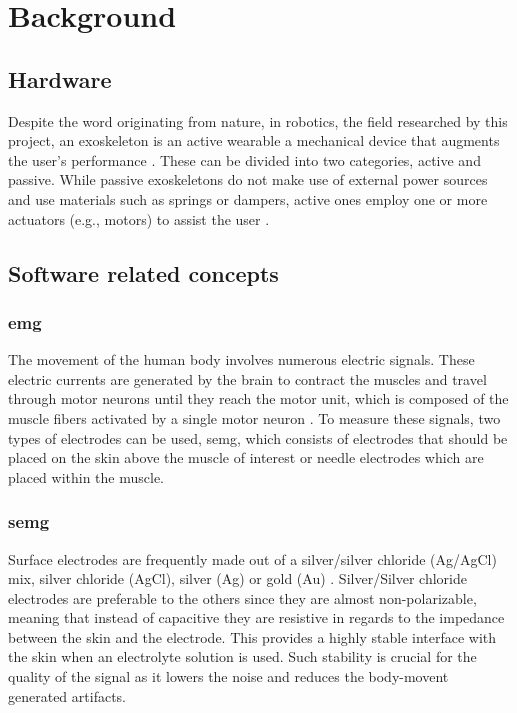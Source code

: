 \section{Background}
\label{section:background}

\subsection{Hardware}

Despite the word originating from nature, in robotics, the field researched by this project, an exoskeleton is an active wearable %
a mechanical device that augments the user's performance \cite{exodefinition}. These can be divided into two categories, active and passive. 
While passive exoskeletons do not make use of external power sources and use materials such as springs or dampers, active ones employ 
one or more actuators (e.g., motors) to assist the user \cite{passiveactiveexo}.


\subsection{Software related concepts}

\subsubsection{\acrfull{emg}}

The movement of the human body involves numerous electric signals. These electric currents are generated by the brain
to contract the muscles and travel through motor neurons until they reach the motor unit, which is composed of the muscle fibers
activated by a single motor neuron \cite{emggen}. To measure these signals, two types of electrodes can be used, \acrshort{semg}, 
which consists of electrodes that should be placed on the skin above the muscle of interest or needle electrodes which are placed within 
the muscle. 

\subsubsection{\acrfull{semg}}

Surface electrodes are frequently made out of a silver/silver chloride (Ag/AgCl) mix, silver chloride (AgCl), silver (Ag) or gold (Au) \cite{sEMG}.
Silver/Silver chloride electrodes are preferable to the others since they are almost non-polarizable, meaning that instead of capacitive
they are resistive in regards to the impedance between the skin and the electrode. This provides a highly stable interface with the skin when 
an electrolyte solution is used. Such stability is crucial for the quality of the signal as it lowers the noise and reduces the body-movent generated
artifacts.

